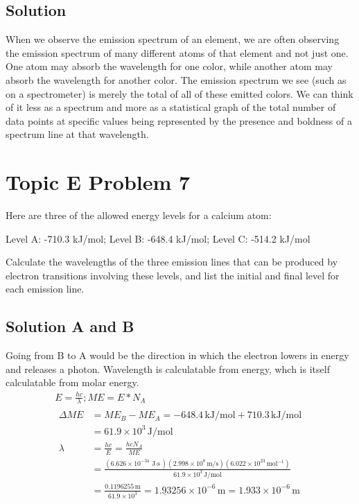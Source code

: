\documentclass[10pt]{article}
\newcommand{\E}[1]{\times 10^{#1}}
\newcommand{\U}[1]{\underline{#1}}
\begin{document}
        \subsection{Solution}
            When we observe the emission spectrum of an element, we are often observing the emission spectrum of many different atoms of that element and not just one.
            One atom may absorb the wavelength for one color, while another atom may absorb the wavelength for another color.
            The emission spectrum we see (such as on a spectrometer) is merely the total of all of these emitted colors.
            We can think of it less as a spectrum and more as a statistical graph of the total number of data points at specific values being represented by the presence and boldness of a spectrum line at that wavelength.

    \pagebreak
    \section{Topic E Problem 7}
        Here are three of the allowed energy levels for a calcium atom:
        \begin{center}
            Level A: -710.3 kJ/mol; Level B: -648.4 kJ/mol; Level C: -514.2 kJ/mol
        \end{center}
        Calculate the wavelengths of the three emission lines that can be produced by electron transitions involving these levels, and list the initial and final level for each emission line.

        \subsection{Solution A and B}
            Going from B to A would be the direction in which the electron lowers in energy and releases a photon.
            Wavelength is calculatable from energy, whch is itself calculatable from molar energy.
            \begin{gather}
                E   =   \frac{hc}{\lambda}; ME  =   E * N_A\\
                \begin{align}
                    \Delta ME   &=  ME_B - ME_A
                        =   -648.4\,\unit{\kilo\joule/\mole} + 710.3\,\unit{\kilo\joule/\mole}\\
                        &=  61.9\E{3}\,\unit{\joule/\mole}\\
                    \lambda &=  \frac{hc}{E}
                        =   \frac{hcN_A}{ME}\\
                        &=  \frac{(6.626\E{-34}\,\unit{\joule\cdot\second})(2.998\E{8}\,\unit{\meter/\second})(6.022\E{23}\,\unit{\mol^{-1}})}{61.9\E{3}\,\unit{\joule/\mole}}\\
                        &=  \frac{0.\U{1196}255\,\unit{\meter}}{61.9\E{3}}
                        =   \U{1.932}56\E{-6}\,\unit{\meter}
                        =   \boxed{1.933\E{-6}\,\unit{\meter}}
                \end{align}
            \end{gather}
        
\end{document}
